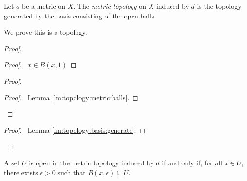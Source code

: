 \begin{df}
  Let $d$ be a metric on $X$. The \emph{metric topology} on $X$ induced by
  $d$ is the topology generated by the basis consisting of the open balls.

  We prove this is a topology.
\end{df}

\begin{proof}
  \pf
  \begin{proof}
    \pf\ $x \in B(x, 1)$
  \end{proof}
  \begin{proof}
    \begin{proof}
      \pf\ Lemma \ref{lm:topology:metric:balls}.
    \end{proof}
  \end{proof}
  \qedstep
  \begin{proof}
    \pf\ Lemma \ref{lm:topology:basis:generate}.
  \end{proof}
\end{proof}

\begin{lm}
  \label{lm:topology:metric:open}
  A set $U$ is open in the metric topology induced by $d$ if and only if, for
  all $x \in U$, there exists $\epsilon > 0$ such that $B(x, \epsilon)
  \subseteq
  U$.
\end{lm}

